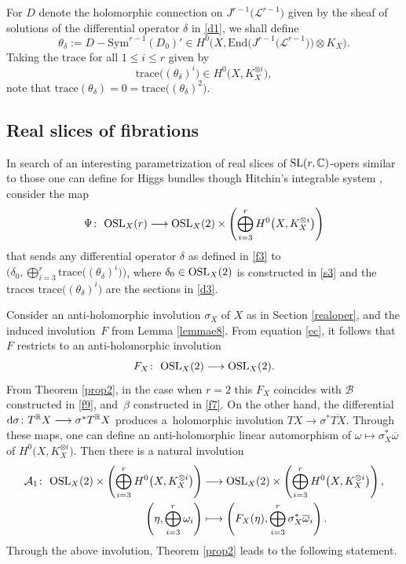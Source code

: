 \documentclass[pdftex]{sigma}
\numberwithin{equation}{section}
\begin{document}
For $D$ denote the holomorphic connection on $J^{r-1}\bigl({\mathcal L}^{r-1}\bigr)$ given by the sheaf of solutions of
the differential operator $\delta$ in \eqref{d1}, we shall define
\[
\theta_\delta := D- \text{Sym}^{r-1}(D_0)' \in H^0\bigl(X, \text{End}\bigl(J^{r-1}\bigl({\mathcal L}^{r-1}\bigr)\bigr)
\otimes K_X\bigr).
\]
Taking the trace for all $1 \leq i \leq r$ given by
\begin{equation}\label{d3}
\text{trace}\bigl((\theta_\delta)^i\bigr) \in H^0\bigl(X, K^{\otimes i}_X\bigr),
\end{equation}
note that $\text{trace}(\theta_\delta) = 0 = \text{trace}\bigl((\theta_\delta)^2\bigr)$.
\subsection{Real slices of fibrations}
In search of an interesting parametrization of real slices of ${\rm SL}(r,\mathbb{C})$-opers similar to those one can define for Higgs bundles though Hitchin's integrable system \cite{Hi}, consider the map
\begin{equation}\label{d2}
\Psi\colon\ {\rm OSL}_X(r) \longrightarrow {\rm OSL}_X(2)\times \left(\bigoplus_{i=3}^r H^0\bigl(X, K^{\otimes i}_X\bigr)\right)
\end{equation}
 that sends any differential operator $\delta$ as defined in \eqref{f3} to
$\bigl(\delta_0, \bigoplus_{i=3}^r \text{trace}\bigl((\theta_\delta)^i\bigr)\bigr)$, where ${\delta_0 \in {\rm OSL}_X(2)}$
is constructed in \eqref{s3} and the traces $\text{trace}\bigl((\theta_\delta)^i\bigr)$ are the sections in \eqref{d3}.

Consider an anti-holomorphic involution $\sigma_X$ of $X$ as in Section \ref{realoper}, and the induced involution~$F$
from Lemma \ref{lemmae8}. From equation \eqref{ec}, it follows that $F$ restricts to an anti-holomorphic involution
\[
F_X\colon\ {\rm OSL}_X(2) \longrightarrow {\rm OSL}_X(2).
\]
From Theorem \ref{prop2}, in the case when $r = 2$ this $F_X$ coincides with $\mathcal B$
constructed in \eqref{f9}, and~$\beta$ constructed in \eqref{f7}. On the other hand, the differential
${\rm d}\sigma\colon T^{\mathbb R}X \longrightarrow \sigma^*T^{\mathbb R}X$ produces a~holomorphic involution $TX \longrightarrow \sigma^*\overline{TX}$. Through these maps, one can define an anti-holomorphic
linear automorphism of $\omega \longmapsto \sigma^*_X\overline{\omega}$ of $H^0\bigl(X, K^{\otimes i}_X\bigr)$.
Then there is a natural involution
\begin{align}
{\mathcal A}_1\colon\ {\rm OSL}_X(2)\times \left(\bigoplus_{i=3}^r H^0\bigl(X, K^{\otimes i}_X\bigr)\right)&
\longrightarrow {\rm OSL}_X(2)\times \left(\bigoplus_{i=3}^r H^0\bigl(X, K^{\otimes i}_X\bigr)\right),\nonumber\\
\left(\eta, \bigoplus_{i=3}^r \omega_i\right)&\longmapsto \left(F_X(\eta),
\bigoplus_{i=3}^r \sigma^*_X\overline{\omega}_i\right). \label{d4}
\end{align}
Through the above involution, Theorem \ref{prop2} leads to the following statement.
\end{document}
